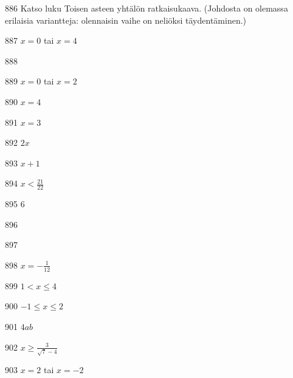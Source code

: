 \begin{Vastaus}{886}
	Katso luku Toisen asteen yhtälön ratkaisukaava. (Johdosta on olemassa erilaisia variantteja: olennaisin vaihe on neliöksi täydentäminen.)
	
\end{Vastaus}
\begin{Vastaus}{887}
$x=0$ tai $x=4$
\end{Vastaus}
\begin{Vastaus}{888}
\end{Vastaus}
\begin{Vastaus}{889}
$x=0$ tai $x=2$
\end{Vastaus}
\begin{Vastaus}{890}
$x = 4$
\end{Vastaus}
\begin{Vastaus}{891}
$x=3$
\end{Vastaus}
\begin{Vastaus}{892}
$2x$
\end{Vastaus}
\begin{Vastaus}{893}
$x+1$
\end{Vastaus}
\begin{Vastaus}{894}
$x<\frac{21}{22}$
\end{Vastaus}
\begin{Vastaus}{895}
$6$
\end{Vastaus}
\begin{Vastaus}{896}
\end{Vastaus}
\begin{Vastaus}{897}
	
\end{Vastaus}
\begin{Vastaus}{898}
$x=-\frac{1}{12}$
\end{Vastaus}
\begin{Vastaus}{899}
$1<x \leq 4$
\end{Vastaus}
\begin{Vastaus}{900}
$-1 \leq x \leq 2$
\end{Vastaus}
\begin{Vastaus}{901}
$4ab$
\end{Vastaus}
\begin{Vastaus}{902}
$x \geq \frac{3}{\sqrt{7}-4}$
\end{Vastaus}
\begin{Vastaus}{903}
$x=2$ tai $x=-2$
\end{Vastaus}
